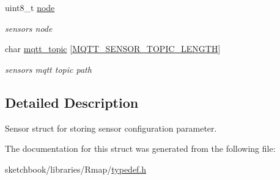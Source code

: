 \begin{DoxyCompactItemize}
uint8\+\_\+t \hyperlink{structsensor__t_a907c65079d3374ff1f18532cf41ccf13}{node}
\begin{DoxyCompactList}\small\item\em sensor\textquotesingle{}s node \end{DoxyCompactList}\item 
\mbox{\label{structsensor__t_a08e3c60cbf75700af6e9529621bfd51f}} 
char \hyperlink{structsensor__t_a08e3c60cbf75700af6e9529621bfd51f}{mqtt\+\_\+topic} \mbox{[}\hyperlink{mqtt__config_8h_a85772fcdfe85fa51f02f3045c0aa7764}{M\+Q\+T\+T\+\_\+\+S\+E\+N\+S\+O\+R\+\_\+\+T\+O\+P\+I\+C\+\_\+\+L\+E\+N\+G\+TH}\mbox{]}
\begin{DoxyCompactList}\small\item\em sensor\textquotesingle{}s mqtt topic path \end{DoxyCompactList}\end{DoxyCompactItemize}


\subsection{Detailed Description}
Sensor struct for storing sensor configuration parameter. 

The documentation for this struct was generated from the following file\+:\begin{DoxyCompactItemize}
\item 
sketchbook/libraries/\+Rmap/\hyperlink{typedef_8h}{typedef.\+h}\end{DoxyCompactItemize}
